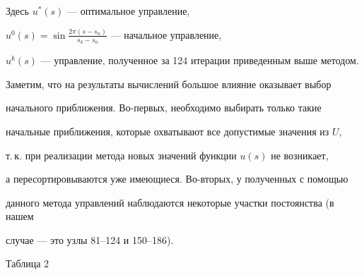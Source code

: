 \smallskip





Здесь $u^*(s)$ --- оптимальное управление, 


$u^0(s)=\sin\frac{2\pi (s-s_n)}{s_k-s_n}$ --- начальное управление,


$u^k(s)$ --- управление, полученное за 124 итерации приведенным выше методом.





Заметим, что на результаты вычислений большое влияние оказывает выбор 


начального приближения. Во-первых, необходимо выбирать только такие


начальные приближения, которые охватывают все допустимые значения из $U$,


т.\,к. при реализации метода новых значений функции $u(s)$ не возникает,


а пересортировываются уже имеющиеся. Во-вторых, у полученных с помощью


данного метода управлений наблюдаются некоторые участки постоянства (в нашем


случае --- это узлы 81--124 и 150--186). 


\smallskip





\hspace{10.7cm} Таблица 2


\smallskip





